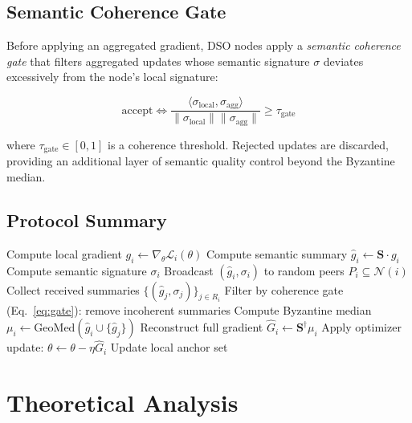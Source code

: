 \documentclass[11pt,a4paper]{article}
\begin{document}
\subsection{Semantic Coherence Gate}

Before applying an aggregated gradient, DSO nodes apply a \emph{semantic coherence
gate} that filters aggregated updates whose semantic signature $\sigma$ deviates
excessively from the node's local signature:

\begin{equation}
    \text{accept} \iff
    \frac{\langle \sigma_{\text{local}}, \sigma_{\text{agg}} \rangle}
         {\|\sigma_{\text{local}}\|\|\sigma_{\text{agg}}\|} \geq \tau_{\text{gate}}
    \label{eq:gate}
\end{equation}

where $\tau_{\text{gate}} \in [0,1]$ is a coherence threshold. Rejected updates are
discarded, providing an additional layer of semantic quality control beyond the
Byzantine median.

\subsection{Protocol Summary}

\begin{algorithm}[H]
\caption{DSO Node Update (one gossip round)}
\begin{algorithmic}[1]
\STATE Compute local gradient $g_i \leftarrow \nabla_\theta \mathcal{L}_i(\theta)$
\STATE Compute semantic summary $\hat{g}_i \leftarrow \mathbf{S} \cdot g_i$
\STATE Compute semantic signature $\sigma_i$
\STATE Broadcast $(\hat{g}_i, \sigma_i)$ to random peers $P_i \subseteq \mathcal{N}(i)$
\STATE Collect received summaries $\{(\hat{g}_j, \sigma_j)\}_{j \in R_i}$
\STATE Filter by coherence gate (Eq.~\ref{eq:gate}): remove incoherent summaries
\STATE Compute Byzantine median $\mu_i \leftarrow \text{GeoMed}(\hat{g}_i \cup \{\hat{g}_j\})$
\STATE Reconstruct full gradient $\hat{G}_i \leftarrow \mathbf{S}^\dagger \mu_i$
\STATE Apply optimizer update: $\theta \leftarrow \theta - \eta \hat{G}_i$
\STATE Update local anchor set
\end{algorithmic}
\end{algorithm}

\section{Theoretical Analysis}
\label{sec:theory}
\end{document}
